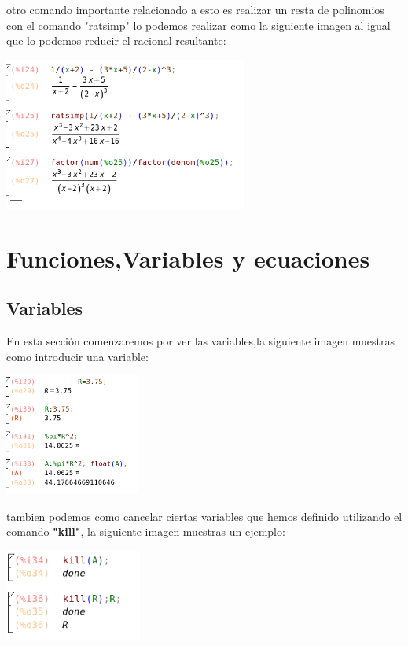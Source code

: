 \documentclass{article}
\begin{document}
otro comando importante relacionado a esto es realizar un resta de polinomios con el comando "ratsimp" lo podemos realizar como la siguiente imagen al igual que lo podemos reducir el racional resultante:

\begin{center}
\includegraphics[height=5cm]{fto11.png}
\end{center}


\section{Funciones,Variables y ecuaciones}

\subsection{Variables}
En esta sección comenzaremos por ver las variables,la siguiente imagen muestras como introducir una variable:


\begin{center}
\includegraphics[height=4cm]{fto12.png}
\end{center}

tambien podemos como cancelar ciertas variables que hemos definido utilizando el comando \textbf{"kill"}, la siguiente imagen muestras un ejemplo:

\begin{center}
\includegraphics[height=3cm]{fto13.png}
\end{center}
\end{document}
